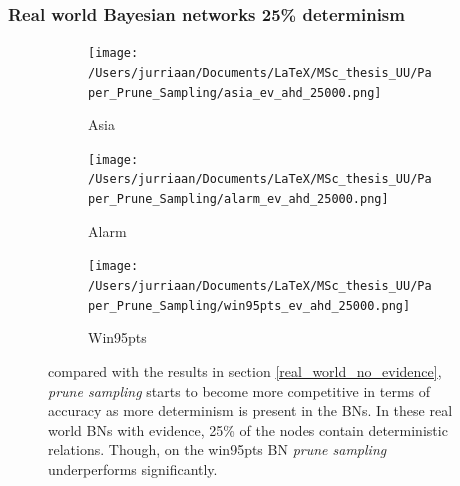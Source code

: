 \documentclass[a4paper, twoside, 11pt]{report}
\theoremstyle{plain}
\theoremstyle{definition}
\theoremstyle{remark}
\newcommand{\ps}{\textit{prune sampling }}
\begin{document}
\newpage
\subsubsection{Real world Bayesian networks 25\% determinism}

\begin{figure}[H]
\centering
\begin{subfigure}{0.5\textwidth}
\texttt{[image: /Users/jurriaan/Documents/LaTeX/MSc\_thesis\_UU/Paper\_Prune\_Sampling/asia\_ev\_ahd\_25000.png]}
\caption{Asia}%
\label{asia}%
\end{subfigure}\hfill%
\begin{subfigure}{0.5\textwidth}
\texttt{[image: /Users/jurriaan/Documents/LaTeX/MSc\_thesis\_UU/Paper\_Prune\_Sampling/alarm\_ev\_ahd\_25000.png]}
\caption{Alarm}%
\label{alarm}%
\end{subfigure}%
\begin{subfigure}{0.5\textwidth}
\texttt{[image: /Users/jurriaan/Documents/LaTeX/MSc\_thesis\_UU/Paper\_Prune\_Sampling/win95pts\_ev\_ahd\_25000.png]}
\caption{Win95pts}%
\label{win95pts}%
\end{subfigure}\hfill%
\vspace{0.75pc}
\caption{compared with the results in section \ref{real_world_no_evidence}, \ps starts to become more competitive in terms of accuracy as more determinism is present in the BNs. In these real world BNs with evidence, 25\% of the nodes contain deterministic relations. Though, on the win95pts BN \ps underperforms significantly.}
\label{results2}
\end{figure}

\newpage
\end{document}
